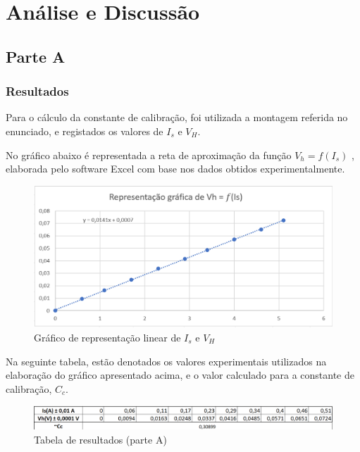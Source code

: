 
\chapter{Análise e Discussão}
\label{ch:analise-discussao}
{

\section{Parte A}
\label{sec:analise-discussao-parte1} 

\subsection{Resultados} \label{subsec:analise-discussao-parte1-resultados}
    Para o cálculo da constante de calibração, foi utilizada a montagem referida no enunciado, e registados os valores de $I_s$ e $V_H$.
    \par No gráfico abaixo é representada a reta de aproximação da função $V_h = f(I_s)$ , elaborada pelo software Excel com base nos dados obtidos experimentalmente.

\begin{figure}[h]
    \centering
    \includegraphics[scale=0.6]{images/grafico1-parte-a.png}
    \caption{Gráfico de representação linear de $I_s$ e $V_H$}
    \label{fig:grafico1-parte-a}
\end{figure}

    Na seguinte tabela, estão denotados os valores experimentais utilizados na elaboração do gráfico apresentado acima, e o valor calculado para a constante de calibração, $C_c$.

\begin{figure}[h]
    \centering
    \includegraphics[scale=0.6]{images/tabela1-parte-a.png}
    \caption{Tabela de resultados (parte A)}
    \label{fig:tabela1-parte-a}
\end{figure}

}
